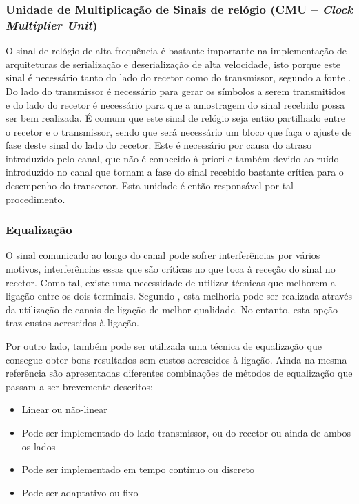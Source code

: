 \subsubsection*{Unidade de Multiplicação de Sinais de relógio (CMU – \textit{Clock Multiplier Unit})}
	
	\hspace{1.0em}O sinal de relógio de alta frequência é bastante importante na implementação de arquiteturas de serialização e deserialização de alta velocidade, isto porque este sinal é necessário tanto do lado do recetor como do transmissor, segundo a fonte \cite{R012}. Do lado do transmissor é necessário para gerar os símbolos a serem transmitidos e do lado do recetor é necessário para que a amostragem do sinal recebido possa ser bem realizada. É comum que este sinal de relógio seja então partilhado entre o recetor e o transmissor, sendo que será necessário um bloco que faça o ajuste de fase deste sinal do lado do recetor. Este é necessário por causa do atraso introduzido pelo canal, que não é conhecido à priori e também devido ao ruído introduzido no canal que tornam a fase do sinal recebido bastante crítica para o desempenho do transcetor. Esta unidade é então responsável por tal procedimento.
	
 \subsubsection*{Equalização}
	
O sinal comunicado ao longo do canal pode sofrer interferências por vários motivos, interferências essas que são críticas no que toca à receção do sinal no recetor. Como tal, existe uma necessidade de utilizar técnicas que melhorem a ligação entre os dois terminais. Segundo \cite{R012}, esta melhoria pode ser realizada através da utilização de canais de ligação de melhor qualidade. No entanto, esta opção traz custos acrescidos à ligação. 
	
Por outro lado, também pode ser utilizada uma técnica de equalização que consegue obter bons resultados sem custos acrescidos à ligação. Ainda na mesma referência são apresentadas diferentes combinações de métodos de equalização que passam a ser brevemente descritos:
	
	\begin{itemize}
		\item Linear ou não-linear
		\item Pode ser implementado do lado transmissor, ou do recetor ou ainda de ambos os lados
		\item Pode ser implementado em tempo contínuo ou discreto
		\item Pode ser adaptativo ou fixo
	\end{itemize}

